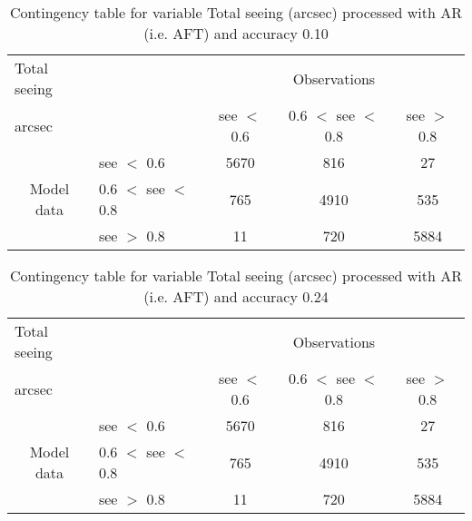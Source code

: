 \documentclass[11pt,english]{article}
\begin{document}
\begin{table}[]
\begin{center}
\begin{tabular}{llccc}
\hline
{Total seeing}                                       &                                                    & \multicolumn{3}{c}{Observations}                 \\
{arcsec}                                       &                             & see $<$ 0.6   & 0.6 $<$ see $<$ 0.8 & see $>$ 0.8 \\
\hline
\multicolumn{1}{c}{\multirow{3}{*}{Model data}}  & see $<$ 0.6             & 5670                & 816                       & 27              \\
                                                 & 0.6  $<$ see $<$ 0.8 & 765                & 4910                       & 535              \\
                                                 & see $>$ 0.8             & 11                & 720                       & 5884              \\
\hline
\end{tabular}
\end{center}
\caption{Contingency table for variable Total seeing (arcsec) processed with AR (i.e. AFT) and accuracy 0.10}
\label{tab:contingencyseeAFT}
\end{table}
\begin{table}[]
\begin{center}
\begin{tabular}{llccc}
\hline
{Total seeing}                                       &                                                    & \multicolumn{3}{c}{Observations}                 \\
{arcsec}                                       &                             & see $<$ 0.6   & 0.6 $<$ see $<$ 0.8 & see $>$ 0.8 \\
\hline
\multicolumn{1}{c}{\multirow{3}{*}{Model data}}  & see $<$ 0.6             & 5670                & 816                       & 27              \\
                                                 & 0.6  $<$ see $<$ 0.8 & 765                & 4910                       & 535              \\
                                                 & see $>$ 0.8             & 11                & 720                       & 5884              \\
\hline
\end{tabular}
\end{center}
\caption{Contingency table for variable Total seeing (arcsec) processed with AR (i.e. AFT) and accuracy 0.24}
\label{tab:contingencyseeAFT}
\end{table}
\end{document}
